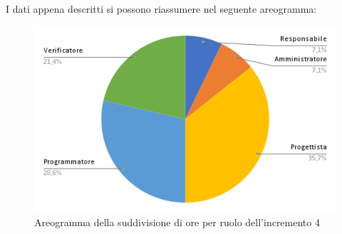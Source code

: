 \pagebreak
I dati appena descritti si possono riassumere nel seguente areogramma:
\begin{figure}[!h]
    \vspace{5px}
    \includegraphics[scale=0.5]{../../../Images/Diagrammi/Diagramma a torta/areogrammaIncremento9.png}
    \centering
    \caption{Areogramma della suddivisione di ore per ruolo dell'incremento 4}
\end{figure}

